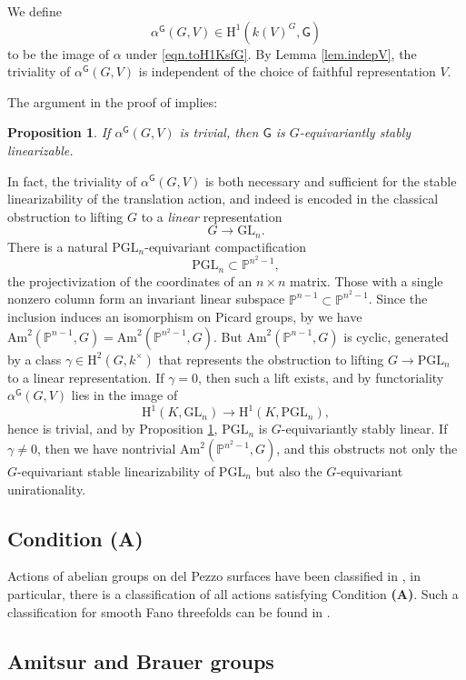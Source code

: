 \documentclass[12pt,reqno]{amsart}
\theoremstyle{plain}
\newtheorem{prop}{Proposition}[section]
\theoremstyle{remark}
\theoremstyle{definition}
\numberwithin{equation}{section}
\newcommand{\bP}{{\mathbb P}}
\newcommand{\rH}{{\mathrm H}}
\newcommand{\GL}{{\mathrm{GL}}}
\newcommand{\PGL}{{\mathrm{PGL}}}
\newcommand{\Am}{\mathrm{Am}}
\begin{document}
We define
\[ \alpha^{\mathsf G}(G,V)\in \rH^1(k(V)^G,\mathsf G) \]
to be the image of $\alpha$ under \eqref{eqn.toH1KsfG}.
By Lemma \ref{lem.indepV},
the triviality of $\alpha^{\mathsf G}(G,V)$ is independent of the choice of faithful representation $V$.

The argument in the proof of \cite[Prop.\ 4.1]{HT-quad} implies: 

\begin{prop}
\label{prop.asinHTquad}
If $\alpha^{\mathsf G}(G,V)$ is trivial, then $\mathsf G$ is $G$-equivariantly stably linearizable.
\end{prop}

In fact, the triviality of $\alpha^{\mathsf G}(G,V)$ is both necessary and sufficient for the stable linearizability of the translation action, and indeed is encoded in the classical obstruction to lifting $G$ to a \emph{linear} representation
\[ G\to \GL_n. \]
There is a natural $\PGL_n$-equivariant compactification
$$
\PGL_n\subset \bP^{n^2-1},
$$
the projectivization of the coordinates of an $n\times n$ matrix. 
Those with a single nonzero column form an invariant linear subspace
$\bP^{n-1}\subset \bP^{n^2-1}$.
Since the inclusion induces an isomorphism on Picard groups, by \cite[Lemma 2.1]{KT-quotient}
we have $\Am^2(\bP^{n-1},G)=\Am^2(\bP^{n^2-1},G)$.
But $\Am^2(\bP^{n-1},G)$ is cyclic, generated by a class $\gamma\in \rH^2(G,k^\times)$ that represents the obstruction to lifting $G\to \PGL_n$
to a linear representation.
If $\gamma=0$,
then such a lift exists, and
by functoriality $\alpha^{\mathsf G}(G,V)$ lies in the image of
\[ \rH^1(K,\GL_n)\to \rH^1(K,\PGL_n), \]
hence is trivial, and
by Proposition \ref{prop.asinHTquad}, $\PGL_n$ is $G$-equivariantly stably linear.
If $\gamma\ne 0$, then we have nontrivial $\Am^2(\bP^{n^2-1},G)$, and this obstructs not only
the $G$-equivariant stable linearizability of $\PGL_n$ but also the $G$-equivariant unirationality.

\subsection*{Condition (A)}
Actions of abelian groups on del Pezzo surfaces have been classified in \cite{blanc-thesis}, in particular, there is a classification of all actions satisfying Condition {\bf (A)}. Such a classification for smooth Fano threefolds can be found in \cite{abban}. 


\subsection*{Amitsur and Brauer groups}
\end{document}

